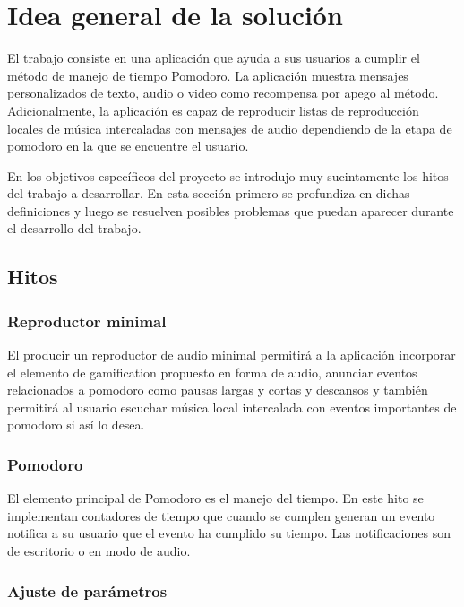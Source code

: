 \documentclass[12pt,letterpaper]{report}
\begin{document}
\newpage
\section{Idea general de la solución}\label{idea-general-de-la-solucion}

El trabajo consiste en una aplicación que ayuda a sus usuarios a cumplir el método de manejo de tiempo Pomodoro. La
aplicación muestra mensajes personalizados de texto, audio o video como recompensa por apego al método. Adicionalmente,
la aplicación es capaz de reproducir listas de reproducción locales de música intercaladas con mensajes de audio
dependiendo de la etapa de pomodoro en la que se encuentre el usuario.

En los objetivos específicos del proyecto se introdujo muy sucintamente los hitos del trabajo a desarrollar. En esta
sección primero se profundiza en dichas definiciones y luego se resuelven posibles problemas que puedan aparecer durante
el desarrollo del trabajo.

\subsection{Hitos}

\subsubsection{Reproductor minimal}

El producir un reproductor de audio minimal permitirá a la aplicación incorporar el elemento de gamification propuesto
en forma de audio, anunciar eventos relacionados a pomodoro como pausas largas y cortas y descansos y también permitirá
al usuario escuchar música local intercalada con eventos importantes de pomodoro si así lo desea.

\subsubsection{Pomodoro}

El elemento principal de Pomodoro es el manejo del tiempo. En este hito se implementan contadores de tiempo que cuando
se cumplen generan un evento notifica a su usuario que el evento ha cumplido su tiempo. Las notificaciones son de
escritorio o en modo de audio.

\subsubsection{Ajuste de parámetros}
\end{document}
